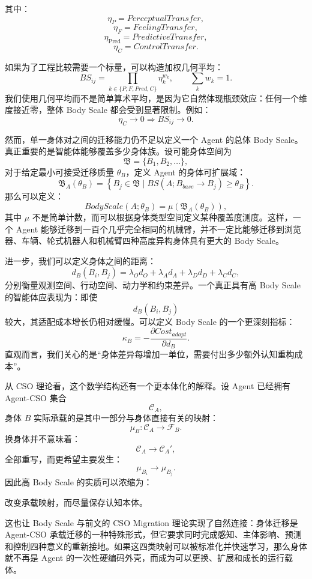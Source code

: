 其中：
\[
\eta_P
=
PerceptualTransfer,
\]
\[
\eta_F
=
FeelingTransfer,
\]
\[
\eta_{\mathrm{Pred}}
=
PredictiveTransfer,
\]
\[
\eta_C
=
ControlTransfer.
\]

如果为了工程比较需要一个标量，可以构造加权几何平均：
\[
BS_{ij}
=
\prod_{k\in\{P,F,Pred,C\}}
\eta_k^{w_k},
\qquad
\sum_k w_k=1.
\]
我们使用几何平均而不是简单算术平均，是因为它自然体现瓶颈效应：任何一个维度接近零，整体 Body Scale 都会受到显著限制。例如：
\[
\eta_C\rightarrow0
\Rightarrow
BS_{ij}\rightarrow0.
\]

然而，单一身体对之间的迁移能力仍不足以定义一个 Agent 的总体 Body Scale。真正重要的是智能体能够覆盖多少身体族。设可能身体空间为
\[
\mathfrak B
=
\{B_1,B_2,\dots\},
\]
对于给定最小可接受迁移质量 $\theta_B$，定义 Agent 的身体可扩展域：
\[
\mathfrak B_A(\theta_B)
=
\left\{
B_j\in\mathfrak B
\mid
BS(A;B_{base}\rightarrow B_j)
\geq\theta_B
\right\}.
\]
那么可以定义：
\[
\boxed{
BodyScale(A;\theta_B)
=
\mu
\left(
\mathfrak B_A(\theta_B)
\right),
}
\]
其中 $\mu$ 不是简单计数，而可以根据身体类型空间定义某种覆盖度测度。这样，一个 Agent 能够迁移到一百个几乎完全相同的机械臂，并不一定比能够迁移到浏览器、车辆、轮式机器人和机械臂四种高度异构身体具有更大的 Body Scale。

进一步，我们可以定义身体之间的距离：
\[
d_B(B_i,B_j)
=
\lambda_O d_O
+
\lambda_A d_A
+
\lambda_D d_D
+
\lambda_C d_C,
\]
分别衡量观测空间、行动空间、动力学和约束差异。一个真正具有高 Body Scale 的智能体应表现为：即使
\[
d_B(B_i,B_j)
\]
较大，其适配成本增长仍相对缓慢。可以定义 Body Scale 的一个更深刻指标：
\[
\kappa_B
=
-
\frac{
\partial Cost_{adapt}
}{
\partial d_B
}.
\]
直观而言，我们关心的是“身体差异每增加一单位，需要付出多少额外认知重构成本”。

从 CSO 理论看，这个数学结构还有一个更本体化的解释。设 Agent 已经拥有 Agent-CSO 集合
\[
\mathcal C_A,
\]
身体 $B$ 实际承载的是其中一部分与身体直接有关的映射：
\[
\mu_B:
\mathcal C_A
\rightarrow
\mathcal F_B.
\]
换身体并不意味着：
\[
\mathcal C_A
\rightarrow
\mathcal C_A',
\]
全部重写，而更希望主要发生：
\[
\mu_{B_i}
\rightarrow
\mu_{B_j}.
\]
因此高 Body Scale 的实质可以浓缩为：
\begin{conclusion}
改变承载映射，而尽量保存认知本体。
\end{conclusion}

这也让 Body Scale 与前文的 CSO Migration 理论实现了自然连接：身体迁移是 Agent-CSO 承载迁移的一种特殊形式，但它要求同时完成感知、主体影响、预测和控制四种意义的重新接地。如果这四类映射可以被标准化并快速学习，那么身体就不再是 Agent 的一次性硬编码外壳，而成为可以更换、扩展和成长的运行载体。


